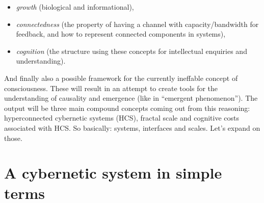 \documentclass[14pt]{extarticle}
\begin{document}
\begin{itemize}
\item \textit{growth} (biological and informational),
\item \textit{connectedness} (the property of having a channel with capacity/bandwidth for feedback, and how to represent connected components in systems), 
\item \textit{cognition} (the structure using these concepts for intellectual enquiries and understanding).
\end{itemize}
And finally also a possible framework for the currently ineffable concept of consciousness.
These will result in an attempt to create tools for the understanding of causality and emergence (like in “emergent phenomenon”). The output will be three main compound concepts coming out from this reasoning: hyperconnected cybernetic systems (HCS), fractal scale and cognitive costs associated with HCS. So basically: systems, interfaces and scales. Let’s expand on those.

\section*{A cybernetic system in simple terms}
\label{sec:cybernetics}
\end{document}

